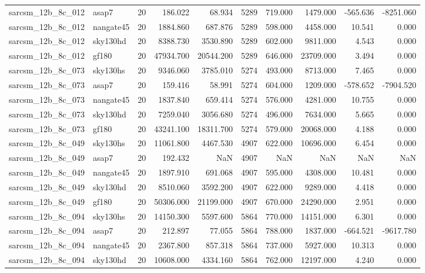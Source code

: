 \documentclass{article}
\begin{document}
\begin{longtable}{llrrrrrrrr}
sarcsm\_12b\_8c\_012 & asap7 & 20 & 186.022 & 68.934 & 5289 & 719.000 & 1479.000 & -565.636 & -8251.060 \\
sarcsm\_12b\_8c\_012 & nangate45 & 20 & 1884.860 & 687.876 & 5289 & 598.000 & 4458.000 & 10.541 & 0.000 \\
sarcsm\_12b\_8c\_012 & sky130hd & 20 & 8388.730 & 3530.890 & 5289 & 602.000 & 9811.000 & 4.543 & 0.000 \\
sarcsm\_12b\_8c\_012 & gf180 & 20 & 47934.700 & 20544.200 & 5289 & 646.000 & 23709.000 & 3.494 & 0.000 \\
sarcsm\_12b\_8c\_073 & sky130hs & 20 & 9346.060 & 3785.010 & 5274 & 493.000 & 8713.000 & 7.465 & 0.000 \\
sarcsm\_12b\_8c\_073 & asap7 & 20 & 159.416 & 58.991 & 5274 & 604.000 & 1209.000 & -578.652 & -7904.520 \\
sarcsm\_12b\_8c\_073 & nangate45 & 20 & 1837.840 & 659.414 & 5274 & 576.000 & 4281.000 & 10.755 & 0.000 \\
sarcsm\_12b\_8c\_073 & sky130hd & 20 & 7259.040 & 3056.680 & 5274 & 496.000 & 7634.000 & 5.665 & 0.000 \\
sarcsm\_12b\_8c\_073 & gf180 & 20 & 43241.100 & 18311.700 & 5274 & 579.000 & 20068.000 & 4.188 & 0.000 \\
sarcsm\_12b\_8c\_049 & sky130hs & 20 & 11061.800 & 4467.530 & 4907 & 622.000 & 10696.000 & 6.454 & 0.000 \\
sarcsm\_12b\_8c\_049 & asap7 & 20 & 192.432 & NaN & 4907 & NaN & NaN & NaN & NaN \\
sarcsm\_12b\_8c\_049 & nangate45 & 20 & 1897.910 & 691.068 & 4907 & 595.000 & 4308.000 & 10.481 & 0.000 \\
sarcsm\_12b\_8c\_049 & sky130hd & 20 & 8510.060 & 3592.200 & 4907 & 622.000 & 9289.000 & 4.418 & 0.000 \\
sarcsm\_12b\_8c\_049 & gf180 & 20 & 50306.000 & 21199.000 & 4907 & 670.000 & 24290.000 & 2.951 & 0.000 \\
sarcsm\_12b\_8c\_094 & sky130hs & 20 & 14150.300 & 5597.600 & 5864 & 770.000 & 14151.000 & 6.301 & 0.000 \\
sarcsm\_12b\_8c\_094 & asap7 & 20 & 212.897 & 77.055 & 5864 & 788.000 & 1837.000 & -664.521 & -9617.780 \\
sarcsm\_12b\_8c\_094 & nangate45 & 20 & 2367.800 & 857.318 & 5864 & 737.000 & 5927.000 & 10.313 & 0.000 \\
sarcsm\_12b\_8c\_094 & sky130hd & 20 & 10608.000 & 4334.160 & 5864 & 762.000 & 12197.000 & 4.240 & 0.000 \\

\end{longtable}
\end{document}
